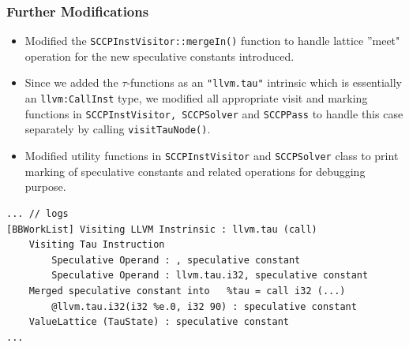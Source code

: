 \documentclass{beamer}
\begin{document}
\begin{frame}[fragile]
	\frametitle{Further Modifications}
	\begin{itemize}
		\item Modified the \texttt{SCCPInstVisitor::mergeIn()} function to handle lattice ''meet" operation for the new speculative constants introduced.  
		\item Since we added the $\tau$-functions as an \texttt{"llvm.tau"} intrinsic which is essentially an \texttt{llvm:CallInst} type, we modified all appropriate visit and marking functions in \texttt{SCCPInstVisitor, SCCPSolver} and \texttt{SCCPPass} to handle this case separately by calling \texttt{visitTauNode()}.
		\item Modified utility functions in \texttt{SCCPInstVisitor} and \texttt{SCCPSolver} class to print marking of speculative constants and related operations for debugging purpose.
	\end{itemize}
\begin{verbatim}
... // logs
[BBWorkList] Visiting LLVM Instrinsic : llvm.tau (call)
	Visiting Tau Instruction
		Speculative Operand : , speculative constant
		Speculative Operand : llvm.tau.i32, speculative constant
	Merged speculative constant into   %tau = call i32 (...) 
		@llvm.tau.i32(i32 %e.0, i32 90) : speculative constant
	ValueLattice (TauState) : speculative constant
...
\end{verbatim}
\end{frame}
\footnotesize
\end{document}
